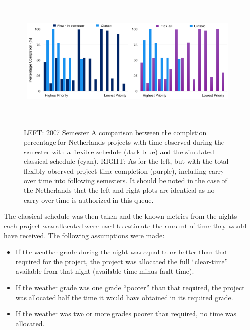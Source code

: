 \documentclass[]{spie}  %
\begin{document}
\begin{figure}
   \begin{center}
   \begin{tabular}{c}
   \includegraphics[height=6cm]{neth_2007A_flexvsclassic}
   \end{tabular}
   \end{center}
   \caption{\label{fig:cvf_neth}LEFT: 2007 Semester A comparison between the completion percentage for Netherlands projects with time observed during the semester with a flexible schedule (dark blue) and the simulated classical schedule (cyan). RIGHT: As for the left, but with the total flexibly-observed project time completion (purple), including carry-over time into following semesters. It should be noted in the case of the Netherlands that the left and right plots are identical as no carry-over time is authorized in this queue.}
\end{figure}

The classical schedule was then taken and the known metrics from the
nights each project was allocated were used to estimate the amount of
time they would have received. The following assumptions were made:
\begin{itemize}
\item If the weather grade during the night was equal to or better
  than that required for the project, the project was allocated the
  full ``clear-time'' available from that night (available time minus
  fault time).
\item If the weather grade was one grade ``poorer'' than that required,
  the project was allocated half the time it would have obtained in
  its required grade.
\item If the weather was two or more grades poorer than required, no
  time was allocated.
\end{itemize}
\end{document}
